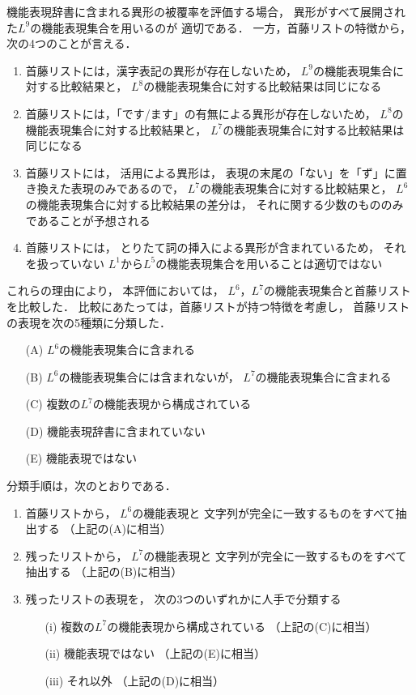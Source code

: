 \documentclass[japanese]{jnlp_1.3e}
\begin{document}
機能表現辞書に含まれる異形の被覆率を評価する場合，
異形がすべて展開された$L^9$の機能表現集合を用いるのが
適切である．
一方，首藤リストの特徴から，次の4つのことが言える．
\begin{enumerate}
\item 首藤リストには，漢字表記の異形が存在しないため，
      $L^9$の機能表現集合に対する比較結果と，
      $L^8$の機能表現集合に対する比較結果は同じになる
\item 首藤リストには，「です/ます」の有無による異形が存在しないため，
      $L^8$の機能表現集合に対する比較結果と，
      $L^7$の機能表現集合に対する比較結果は同じになる
\item 首藤リストには，
      活用による異形は，
      表現の末尾の「ない」を「ず」に置き換えた表現のみであるので，
      $L^7$の機能表現集合に対する比較結果と，
      $L^6$の機能表現集合に対する比較結果の差分は，
      それに関する少数のもののみであることが予想される
\item 首藤リストには，
      とりたて詞の挿入による異形が含まれているため，
      それを扱っていない
      $L^1$から$L^5$の機能表現集合を用いることは適切ではない      
\end{enumerate}
これらの理由により，
本評価においては，
$L^6$，$L^7$の機能表現集合と首藤リストを比較した．
比較にあたっては，首藤リストが持つ特徴を考慮し，
首藤リストの表現を次の5種類に分類した．
\begin{enumerate}
\item[(A)] $L^6$の機能表現集合に含まれる
\item[(B)] $L^6$の機能表現集合には含まれないが，
           $L^7$の機能表現集合に含まれる
\item[(C)] 複数の$L^7$の機能表現から構成されている
\item[(D)] 機能表現辞書に含まれていない
\item[(E)] 機能表現ではない
\end{enumerate}
分類手順は，次のとおりである．
\begin{enumerate}
 \item 首藤リストから，
       $L^6$の機能表現と
       文字列が完全に一致するものをすべて抽出する
       （上記の(A)に相当）
 \item 残ったリストから，
       $L^7$の機能表現と
       文字列が完全に一致するものをすべて抽出する
       （上記の(B)に相当）
 \item 残ったリストの表現を，
       次の3つのいずれかに人手で分類する

 \begin{enumerate}
  \item[(i)] 複数の$L^7$の機能表現から構成されている
             （上記の(C)に相当）
  \item[(ii)] 機能表現ではない
             （上記の(E)に相当）
  \item[(iii)] それ以外
             （上記の(D)に相当）
 \end{enumerate}      
\end{enumerate}
\end{document}
